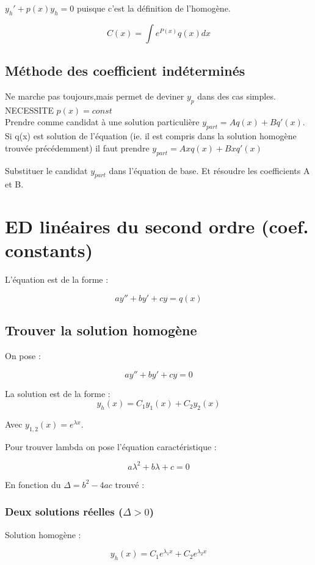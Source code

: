 \documentclass[12pt,a4paper]{report}
\begin{document}
$y_h' + p(x)y_h = 0$ puisque c'est la définition de l'homogène.

$$C(x) = \int e^{P(x)} q(x) dx$$

\subsection{Méthode des coefficient indéterminés}

Ne marche pas toujours,mais permet de deviner $y_p$ dans des cas simples. NECESSITE $p(x) = const$ \\

Prendre comme candidat à une solution particulière $y_{part} = Aq(x) + Bq'(x)$. Si q(x) est solution de l'équation (ie. il est compris dans la solution homogène trouvée précédemment) il faut prendre $y_{part} = Axq(x)+ Bxq'(x)$

Substituer le candidat $y_{part}$ dans l'équation de base. Et résoudre les coefficients A et B.

\section{ED linéaires du second ordre (coef. constants)}

L'équation est de la forme :

$$ay'' + by' + cy = q(x)$$

\subsection{Trouver la solution homogène}

On pose :

$$ay'' + by' + cy = 0$$

La solution est de la forme : 
$$y_h(x) = C_1y_1(x) + C_2y_2(x)$$

Avec $y_{1,2}(x) = e^{\lambda x}$.

Pour trouver lambda on pose l'équation caractéristique :

$$a\lambda^2 + b\lambda + c = 0$$

En fonction du $\Delta = b^2 - 4ac$ trouvé :

\subsubsection{Deux solutions réelles ($\Delta > 0$)}


Solution homogène :

$$y_h(x) = C_1e^{\lambda_1x} + C_2e^{\lambda_2x}$$
\end{document}

